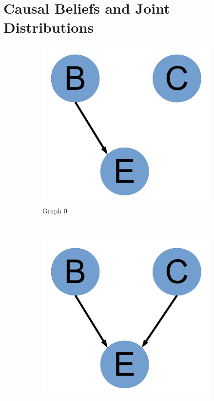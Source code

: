 \documentclass[11pt]{article}
\begin{document}
\section{Causal Beliefs and Joint Distributions}
\label{sec-2}


\begin{figure}
        \centering
        \begin{subfigure}[b]{0.3\textwidth}
                \includegraphics[width=\textwidth]{Graph0.pdf}
                \caption{Graph 0}
                \label{fig:gull}
        \end{subfigure}%
        ~ %
        \begin{subfigure}[b]{0.3\textwidth}
                \includegraphics[width=\textwidth]{Graph1.pdf}

\end{subfigure}
\end{figure}
\end{document}
